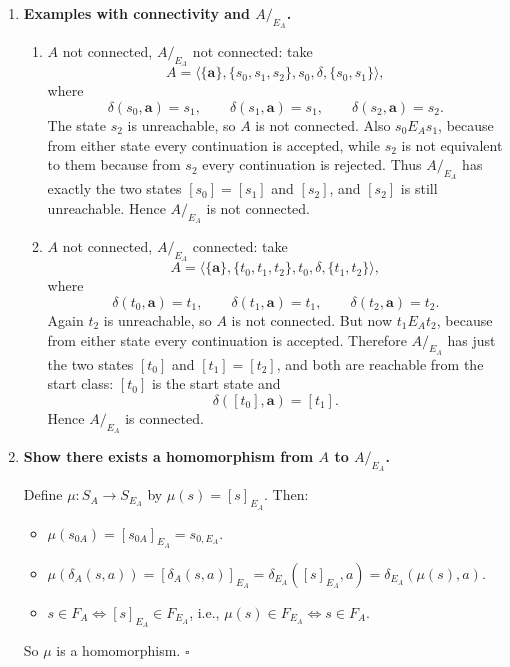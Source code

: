 \begin{enumerate}[{3.}1.]
For any $x\in\Sigma^*$,
\begin{align*}
x\in L(A)
&\Leftrightarrow \DBAR_A(s_{0A},x)\in F_A \\
&\Leftrightarrow \mu(\DBAR_A(s_{0A},x))\in F_B
\qquad\text{(because $\mu(s)\in F_B \Leftrightarrow s\in F_A$)} \\
&\Leftrightarrow \DBAR_B(\mu(s_{0A}),x)\in F_B
\qquad\text{(by Exercise 3.10)} \\
&\Leftrightarrow \DBAR_B(s_{0B},x)\in F_B
\qquad\text{(since $\mu(s_{0A})=s_{0B}$)} \\
&\Leftrightarrow x\in L(B).
\end{align*}
Therefore $L(A)=L(B)$. $\square$

\item \textbf{Examples with connectivity and $A/_{E_A}$.}

\begin{enumerate}
\item $A$ not connected, $A/_{E_A}$ not connected: take
\[
A=\langle\{\pmb{a}\},\{s_0,s_1,s_2\},s_0,\delta,\{s_0,s_1\}\rangle,
\]
where
\[
\delta(s_0,\pmb{a})=s_1,\qquad \delta(s_1,\pmb{a})=s_1,\qquad
\delta(s_2,\pmb{a})=s_2.
\]
The state $s_2$ is unreachable, so $A$ is not connected. Also $s_0 E_A s_1$,
because from either state every continuation is accepted, while $s_2$ is not
equivalent to them because from $s_2$ every continuation is rejected. Thus
$A/_{E_A}$ has exactly the two states $[s_0]=[s_1]$ and $[s_2]$, and $[s_2]$ is
still unreachable. Hence $A/_{E_A}$ is not connected.

\item $A$ not connected, $A/_{E_A}$ connected: take
\[
A=\langle\{\pmb{a}\},\{t_0,t_1,t_2\},t_0,\delta,\{t_1,t_2\}\rangle,
\]
where
\[
\delta(t_0,\pmb{a})=t_1,\qquad \delta(t_1,\pmb{a})=t_1,\qquad
\delta(t_2,\pmb{a})=t_2.
\]
Again $t_2$ is unreachable, so $A$ is not connected. But now $t_1 E_A t_2$,
because from either state every continuation is accepted. Therefore
$A/_{E_A}$ has just the two states $[t_0]$ and $[t_1]=[t_2]$, and both are
reachable from the start class: $[t_0]$ is the start state and
\[
\delta([t_0],\pmb{a})=[t_1].
\]
Hence $A/_{E_A}$ is connected.
\end{enumerate}

\item \textbf{Show there exists a homomorphism from $A$ to $A/_{E_A}$.}

Define $\mu: S_A\to S_{E_A}$ by $\mu(s)=[s]_{E_A}$. Then:
\begin{itemize}
\item $\mu(s_{0A})=[s_{0A}]_{E_A}=s_{0,E_A}$. \checkmark
\item $\mu(\delta_A(s,a))=[\delta_A(s,a)]_{E_A}=\delta_{E_A}([s]_{E_A},a)=\delta_{E_A}(\mu(s),a)$. \checkmark
\item $s\in F_A\Leftrightarrow[s]_{E_A}\in F_{E_A}$, i.e., $\mu(s)\in F_{E_A}\Leftrightarrow s\in F_A$. \checkmark
\end{itemize}
So $\mu$ is a homomorphism. $\square$


\end{enumerate}
